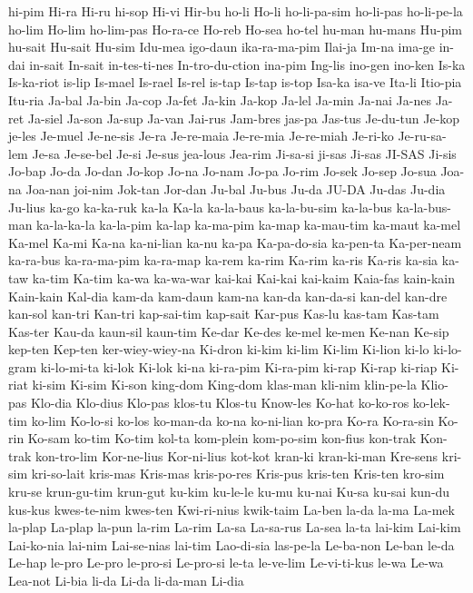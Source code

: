 {hi-pim
Hi-ra
Hi-ru
hi-sop
Hi-vi
Hir-bu
ho-li
Ho-li
ho-li-pa-sim
ho-li-pas
ho-li-pe-la
ho-lim
Ho-lim
ho-lim-pas
Ho-ra-ce
Ho-reb
Ho-sea
ho-tel
hu-man
hu-mans
Hu-pim
hu-sait
Hu-sait
Hu-sim
Idu-mea
igo-daun
ika-ra-ma-pim
Ilai-ja
Im-na
ima-ge
in-dai
in-sait
In-sait
in-tes-ti-nes
In-tro-du-ction
ina-pim
Ing-lis
ino-gen
ino-ken
Is-ka
Is-ka-riot
is-lip
Is-mael
Is-rael
Is-rel
is-tap
Is-tap
is-top
Isa-ka
isa-ve
Ita-li
Itio-pia
Itu-ria
Ja-bal
Ja-bin
Ja-cop
Ja-fet
Ja-kin
Ja-kop
Ja-lel
Ja-min
Ja-nai
Ja-nes
Ja-ret
Ja-siel
Ja-son
Ja-sup
Ja-van
Jai-rus
Jam-bres
jas-pa
Jas-tus
Je-du-tun
Je-kop
je-les
Je-muel
Je-ne-sis
Je-ra
Je-re-maia
Je-re-mia
Je-re-miah
Je-ri-ko
Je-ru-sa-lem
Je-sa
Je-se-bel
Je-si
Je-sus
jea-lous
Jea-rim
Ji-sa-si
ji-sas
Ji-sas
JI-SAS
Ji-sis
Jo-bap
Jo-da
Jo-dan
Jo-kop
Jo-na
Jo-nam
Jo-pa
Jo-rim
Jo-sek
Jo-sep
Jo-sua
Joa-na
Joa-nan
joi-nim
Jok-tan
Jor-dan
Ju-bal
Ju-bus
Ju-da
JU-DA
Ju-das
Ju-dia
Ju-lius
ka-go
ka-ka-ruk
ka-la
Ka-la
ka-la-baus
ka-la-bu-sim
ka-la-bus
ka-la-bus-man
ka-la-ka-la
ka-la-pim
ka-lap
ka-ma-pim
ka-map
ka-mau-tim
ka-maut
ka-mel
Ka-mel
Ka-mi
Ka-na
ka-ni-lian
ka-nu
ka-pa
Ka-pa-do-sia
ka-pen-ta
Ka-per-neam
ka-ra-bus
ka-ra-ma-pim
ka-ra-map
ka-rem
ka-rim
Ka-rim
ka-ris
Ka-ris
ka-sia
ka-taw
ka-tim
Ka-tim
ka-wa
ka-wa-war
kai-kai
Kai-kai
kai-kaim
Kaia-fas
kain-kain
Kain-kain
Kal-dia
kam-da
kam-daun
kam-na
kan-da
kan-da-si
kan-del
kan-dre
kan-sol
kan-tri
Kan-tri
kap-sai-tim
kap-sait
Kar-pus
Kas-lu
kas-tam
Kas-tam
Kas-ter
Kau-da
kaun-sil
kaun-tim
Ke-dar
Ke-des
ke-mel
ke-men
Ke-nan
Ke-sip
kep-ten
Kep-ten
ker-wiey-wiey-na
Ki-dron
ki-kim
ki-lim
Ki-lim
Ki-lion
ki-lo
ki-lo-gram
ki-lo-mi-ta
ki-lok
Ki-lok
ki-na
ki-ra-pim
Ki-ra-pim
ki-rap
Ki-rap
ki-riap
Ki-riat
ki-sim
Ki-sim
Ki-son
king-dom
King-dom
klas-man
kli-nim
klin-pe-la
Klio-pas
Klo-dia
Klo-dius
Klo-pas
klos-tu
Klos-tu
Know-les
Ko-hat
ko-ko-ros
ko-lek-tim
ko-lim
Ko-lo-si
ko-los
ko-man-da
ko-na
ko-ni-lian
ko-pra
Ko-ra
Ko-ra-sin
Ko-rin
Ko-sam
ko-tim
Ko-tim
kol-ta
kom-plein
kom-po-sim
kon-fius
kon-trak
Kon-trak
kon-tro-lim
Kor-ne-lius
Kor-ni-lius
kot-kot
kran-ki
kran-ki-man
Kre-sens
kri-sim
kri-so-lait
kris-mas
Kris-mas
kris-po-res
Kris-pus
kris-ten
Kris-ten
kro-sim
kru-se
krun-gu-tim
krun-gut
ku-kim
ku-le-le
ku-mu
ku-nai
Ku-sa
ku-sai
kun-du
kus-kus
kwes-te-nim
kwes-ten
Kwi-ri-nius
kwik-taim
La-ben
la-da
la-ma
La-mek
la-plap
La-plap
la-pun
la-rim
La-rim
La-sa
La-sa-rus
La-sea
la-ta
lai-kim
Lai-kim
Lai-ko-nia
lai-nim
Lai-se-nias
lai-tim
Lao-di-sia
las-pe-la
Le-ba-non
Le-ban
le-da
Le-hap
le-pro
Le-pro
le-pro-si
Le-pro-si
le-ta
le-ve-lim
Le-vi-ti-kus
le-wa
Le-wa
Lea-not
Li-bia
li-da
Li-da
li-da-man
Li-dia
}
